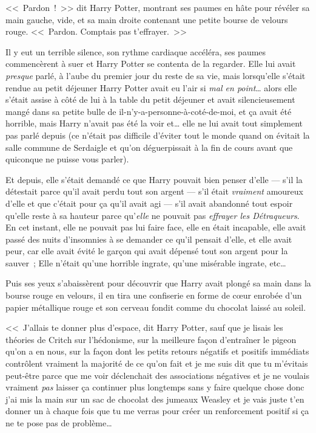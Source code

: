 <<~Pardon~!~>> dit Harry Potter, montrant ses paumes en hâte pour révéler sa main gauche, vide, et sa main droite contenant une petite bourse de velours rouge. <<~Pardon. Comptais pas t'effrayer.~>>

Il y eut un terrible silence, son rythme cardiaque accéléra, ses paumes commencèrent à suer et Harry Potter se contenta de la regarder. Elle lui avait \emph{presque} parlé, à l'aube du premier jour du reste de sa vie, mais lorsqu'elle s'était rendue au petit déjeuner Harry Potter avait eu l'air si \emph{mal en point}… alors elle s'était assise à côté de lui à la table du petit déjeuner et avait silencieusement mangé dans sa petite bulle de il-n'y-a-personne-à-coté-de-moi, et ça avait été horrible, mais Harry n'avait pas été la voir et… elle ne lui avait tout simplement pas parlé depuis (ce n'était pas difficile d'éviter tout le monde quand on évitait la salle commune de Serdaigle et qu'on déguerpissait à la fin de cours avant que quiconque ne puisse vous parler).

Et depuis, elle s'était demandé ce que Harry pouvait bien penser d'elle — s'il la détestait parce qu'il avait perdu tout son argent — s'il était \emph{vraiment} amoureux d'elle et que c'était pour ça qu'il avait agi — s'il avait abandonné tout espoir qu'elle reste à sa hauteur parce qu'\emph{elle} ne pouvait pas \emph{effrayer les Détraqueurs}. En cet instant, elle ne pouvait pas lui faire face, elle en était incapable, elle avait passé des nuits d'insomnies à se demander ce qu'il pensait d'elle, et elle avait peur, car elle avait évité le garçon qui avait dépensé tout son argent pour la sauver~; Elle n'était qu'une horrible ingrate, qu'une misérable ingrate, etc…

Puis ses yeux s'abaissèrent pour découvrir que Harry avait plongé sa main dans la bourse rouge en velours, il en tira une confiserie en forme de cœur enrobée d'un papier métallique rouge et son cerveau fondit comme du chocolat laissé au soleil.

<<~J'allais te donner plus d'espace, dit Harry Potter, sauf que je lisais les théories de Critch sur l'hédonisme, sur la meilleure façon d'entraîner le pigeon qu'on a en nous, sur la façon dont les petits retours négatifs et positifs immédiats contrôlent vraiment la majorité de ce qu'on fait et je me suis dit que tu m'évitais peut-être parce que me voir déclenchait des associations négatives et je ne voulais vraiment \emph{pas} laisser ça continuer plus longtemps sans y faire quelque chose donc j'ai mis la main sur un sac de chocolat des jumeaux Weasley et je vais juste t'en donner un à chaque fois que tu me verras pour créer un renforcement positif si ça ne te pose pas de problème…

